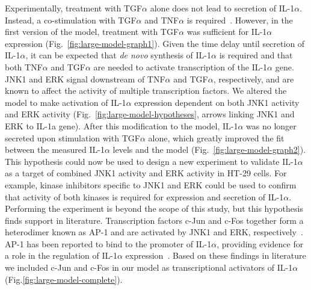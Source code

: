 Experimentally,
treatment with TGF$\alpha$ alone does not lead to secretion of IL-1$\alpha$. Instead, a co-stimulation with 
TGF$\alpha$ and TNF$\alpha$ is required~\citep{pathway-autocrine}.
However, in the first version of the model, treatment with TGF$\alpha$ was sufficient for
IL-1$\alpha$ expression (Fig.~\ref{fig:large-model-graph1}). Given the time delay until secretion of IL-1$\alpha$, it can be
expected that \emph{de novo} synthesis of IL-1$\alpha$ is required and that both
TNF$\alpha$ and TGF$\alpha$ are needed to activate transcription of the IL-1$\alpha$ gene.
JNK1 and ERK signal downstream of TNF$\alpha$ and TGF$\alpha$, respectively, and are known
to affect the activity of multiple transcription factors. We altered the model to make
activation of IL-1$\alpha$ expression dependent on both JNK1 activity and ERK activity
(Fig.~\ref{fig:large-model-hypotheses}, arrows linking {\sf JNK1} and {\sf ERK} to {\sf IL-1a gene}).
After this modification to the model, IL-1$\alpha$ was no longer secreted
upon stimulation with TGF$\alpha$ alone, which greatly improved the fit between the measured IL-1$\alpha$ 
levels and the model (Fig.~\ref{fig:large-model-graph2}). This hypothesis could now be used to 
design a new experiment to validate IL-1$\alpha$ as a target of combined JNK1 activity and ERK activity in 
HT-29 cells. For example, kinase inhibitors specific to JNK1 and ERK could be used to confirm that activity of 
both kinases is required for expression and secretion of IL-1$\alpha$. Performing the experiment is beyond 
the scope of this study, but this hypothesis finds support in literature. 
Transcription factors c-Jun and c-Fos together
form a heterodimer known as AP-1 and are activated by JNK1 and ERK,
respectively~\citep{jnk-signaling,cfos-cjun}. AP-1 has been reported to bind to the
promoter of IL-1$\alpha$, providing evidence for a role in the regulation of IL-1$\alpha$
expression~\citep{ap1-il1a}. Based on these findings in literature we included c-Jun and
c-Fos in our model as transcriptional activators of IL-1$\alpha$ (Fig.\ref{fig:large-model-complete}).

